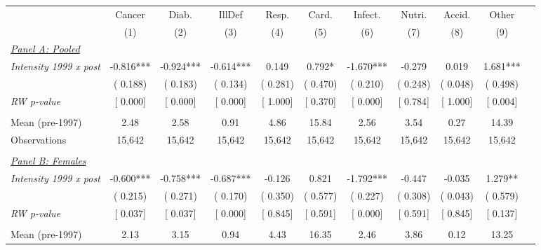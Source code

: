 \begin{tabular}{lcccccccccc} \hline \hline
& Cancer & Diab. & IllDef & Resp. & Card. & Infect. & Nutri. & Accid. & Other \\ 
\cmidrule(lr){2-2}\cmidrule(lr){3-3}\cmidrule(lr){4-4}\cmidrule(lr){5-5}\cmidrule(lr){6-6}\cmidrule(lr){7-7}\cmidrule(lr){8-8}\cmidrule(lr){9-9}\cmidrule(lr){10-10}
& \multicolumn{1}{c}{(1)} & \multicolumn{1}{c}{(2)} & \multicolumn{1}{c}{(3)} & \multicolumn{1}{c}{(4)} & \multicolumn{1}{c}{(5)} & \multicolumn{1}{c}{(6)} & \multicolumn{1}{c}{(7)} & \multicolumn{1}{c}{(8)} & \multicolumn{1}{c}{(9)} \\ \toprule
\underline{\textit{Panel A: Pooled}}  \\ 
\textit{Intensity 1999 x post} &       -0.816*** &       -0.924*** &       -0.614*** &        0.149 &        0.792* &       -1.670*** &       -0.279 &        0.019 &        1.681*** \\ 
 & (       0.188) & (       0.183) & (       0.134) & (       0.281) & (       0.470) & (       0.210) & (       0.248) & (       0.048) & (       0.498) \\ 
\textit{RW p-value} & [ 0.000] & [ 0.000] & [ 0.000] & [ 1.000] & [ 0.370] & [ 0.000] & [ 0.784] & [ 1.000] & [ 0.004] \\ 
  & & & & & & & & & \\ 
Mean (pre-1997) &         2.48 &         2.58 &         0.91 &         4.86 &        15.84 &         2.56 &         3.54 &         0.27 &        14.39 \\ 
Observations &       15,642 &       15,642 &       15,642 &       15,642 &       15,642 &       15,642 &       15,642 &       15,642 &       15,642 \\ 
  & & & & & & & & & \\ 
\underline{\textit{Panel B: Females}}  \\ 
\textit{Intensity 1999 x post} &       -0.600*** &       -0.758*** &       -0.687*** &       -0.126 &        0.821 &       -1.792*** &       -0.447 &       -0.035 &        1.279** \\ 
 & (       0.215) & (       0.271) & (       0.170) & (       0.350) & (       0.577) & (       0.227) & (       0.308) & (       0.043) & (       0.579) \\ 
\textit{RW p-value} & [ 0.037] & [ 0.037] & [ 0.000] & [ 0.845] & [ 0.591] & [ 0.000] & [ 0.591] & [ 0.845] & [ 0.137] \\ 
  & & & & & & & & & \\ 
Mean (pre-1997) &         2.13 &         3.15 &         0.94 &         4.43 &        16.35 &         2.46 &         3.86 &         0.12 &        13.25 \\ 

\end{tabular}
